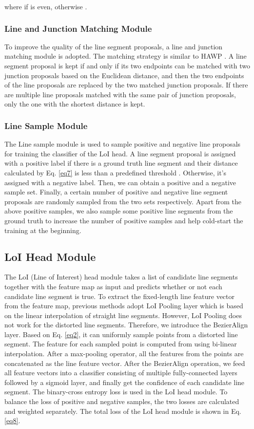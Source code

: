 \documentclass[letterpaper, 10 pt, conference]{ieeeconf}
\begin{document}
where  if  is even, otherwise .

\subsubsection{\textbf{Line and Junction Matching Module}} \label{sec3-4-3}
To improve the quality of the line segment proposals, a line and junction matching module is adopted. The matching strategy is similar to HAWP \cite{HAWP}. A line segment proposal is kept if and only if its two endpoints can be matched with two junction proposals based on the Euclidean distance, and then the two endpoints of the line proposals are replaced by the two matched junction proposals. If there are multiple line proposals matched with the same pair of junction proposals, only the one with the shortest distance is kept.

\subsubsection{\textbf{Line Sample Module}} \label{sec3-4-4} 
The Line sample module is used to sample positive and negative line proposals for training the classifier of the LoI head. A line segment proposal is assigned with a positive label if there is a ground truth line segment and their distance calculated by Eq. \ref{eq7} is less than a predefined threshold . Otherwise, it's assigned with a negative label. Then, we can obtain a positive and a negative sample set. Finally, a certain number of positive and negative line segment proposals are randomly sampled from the two sets respectively. Apart from the above positive samples, we also sample some positive line segments from the ground truth to increase the number of positive samples and help cold-start \cite{LCNN} the training at the beginning.


\subsection{LoI Head Module} \label{sec3-5}
The LoI (Line of Interest) head module takes a list of candidate line segments together with the feature map  as input and predicts whether or not each candidate line segment is true. To extract the fixed-length line feature vector from the feature map, previous methods \cite{LCNN, HAWP} adopt LoI Pooling layer \cite{LCNN} which is based on the linear interpolation of straight line segments. However, LoI Pooling does not work for the distorted line segments. Therefore, we introduce the BezierAlign layer. Based on Eq. \ref{eq2}, it can uniformly sample  points from a distorted line segment. The feature for each sampled point is computed from  using bi-linear interpolation. After a  max-pooling operator, all the features from the  points are concatenated as the line feature vector. After the BezierAlign operation, we feed all feature vectors into a classifier consisting of multiple fully-connected layers followed by a sigmoid layer, and finally get the confidence of each candidate line segment. The binary-cross entropy loss is used in the LoI head module. To balance the loss of positive and negative samples, the two losses are calculated and weighted separately. The total loss of the LoI head module is shown in Eq. \ref{eq8}.
\end{document}
